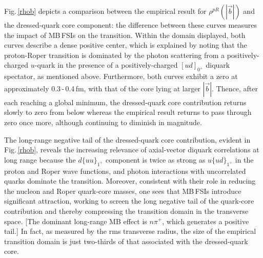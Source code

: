 Fig.\,\ref{rhob} depicts a comparison between the empirical result for $\rho^{pR}(|\vec{b}|)$ and the dressed-quark core component: the difference between these curves measures the impact of MB\,FSIs on the transition.
%
Within the domain displayed, both curves describe a dense positive center, which is explained by noting that the proton-Roper transition is dominated by the photon scattering from a positively-charged $u$-quark in the presence of a positively-charged $[ud]_{0^+}$ diquark spectator, as mentioned above.
%
Furthermore, both curves exhibit a zero at approximately 0.3\,-\,0.4\,fm, with that of the core lying at larger $|\vec{b}|$.  Thence, after each reaching a global minimum, the dressed-quark core contribution returns slowly to zero from below whereas the empirical result returns to pass through zero once more, although continuing to diminish in magnitude.

The long-range negative tail of the dressed-quark core contribution, evident in Fig.\,\ref{rhob}, reveals the increasing relevance of axial-vector diquark correlations at long range because the $d\{uu\}_{1^+}$ component is twice as strong as $u\{ud\}_{1^+}$ in the proton and Roper wave functions, and photon interactions with uncorrelated quarks dominate the transition.
%
Moreover, consistent with their role in reducing the nucleon and Roper quark-core masses, one sees that MB\,FSIs introduce significant attraction, working to screen the long negative tail of the quark-core contribution and thereby compressing the transition domain in the transverse space.  [The dominant long-range MB effect is $n\pi^+$, which generates a positive tail.] In fact, as measured by the rms transverse radius, the size of the empirical transition domain is just two-thirds of that associated with the dressed-quark core.

%




